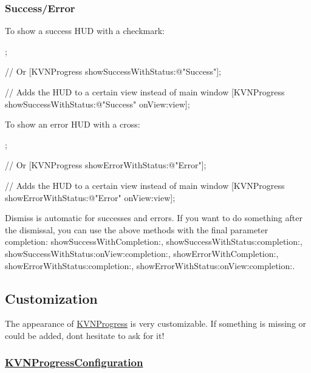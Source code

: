 \subsubsection*{Success/\+Error}

To show a success H\+UD with a checkmark\+:


\begin{DoxyCode}
;

// Or
[KVNProgress showSuccessWithStatus:@"Success"];

// Adds the HUD to a certain view instead of main window
[KVNProgress showSuccessWithStatus:@"Success"
                            onView:view];
\end{DoxyCode}


To show an error H\+UD with a cross\+:


\begin{DoxyCode}
;

// Or
[KVNProgress showErrorWithStatus:@"Error"];

// Adds the HUD to a certain view instead of main window
[KVNProgress showErrorWithStatus:@"Error"
                          onView:view];
\end{DoxyCode}


Dismiss is automatic for successes and errors. If you want to do something after the dismissal, you can use the above methods with the final parameter {\ttfamily completion}\+: {\ttfamily show\+Success\+With\+Completion\+:}, {\ttfamily show\+Success\+With\+Status\+:completion\+:}, {\ttfamily show\+Success\+With\+Status\+:on\+View\+:completion\+:}, {\ttfamily show\+Error\+With\+Completion\+:}, {\ttfamily show\+Error\+With\+Status\+:completion\+:}, {\ttfamily show\+Error\+With\+Status\+:on\+View\+:completion\+:}.

\subsection*{Customization}

The appearance of \mbox{\hyperlink{interface_k_v_n_progress}{K\+V\+N\+Progress}} is very customizable. If something is missing or could be added, don\textquotesingle{}t hesitate to ask for it!

\subsubsection*{\label{_KVNProgressConfiguration}%
\mbox{\hyperlink{interface_k_v_n_progress_configuration}{K\+V\+N\+Progress\+Configuration}}}

